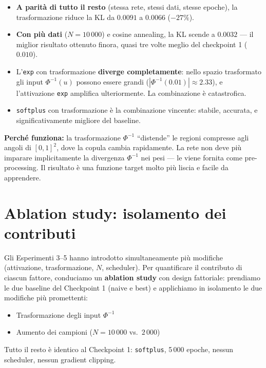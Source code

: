 \documentclass[11pt, a4paper]{article}
\begin{document}
\begin{itemize}
    \item \textbf{A parità di tutto il resto} (stessa rete, stessi dati, stesse epoche), la trasformazione riduce la KL da $0.0091$ a $0.0066$ ($-27\%$).
    \item \textbf{Con più dati} ($N = 10\,000$) e cosine annealing, la KL scende a $\mathbf{0.0032}$ --- il miglior risultato ottenuto finora, quasi tre volte meglio del checkpoint 1 ($0.010$).
    \item L'\texttt{exp} con trasformazione \textbf{diverge completamente}: nello spazio trasformato gli input $\Phi^{-1}(u)$ possono essere grandi ($|\Phi^{-1}(0.01)| \approx 2.33$), e l'attivazione \texttt{exp} amplifica ulteriormente. La combinazione è catastrofica.
    \item \texttt{softplus} con trasformazione è la combinazione vincente: stabile, accurata, e significativamente migliore del baseline.
\end{itemize}

\textbf{Perché funziona:} la trasformazione $\Phi^{-1}$ ``distende'' le regioni compresse agli angoli di $[0,1]^2$, dove la copula cambia rapidamente. La rete non deve più imparare implicitamente la divergenza $\Phi^{-1}$ nei pesi --- le viene fornita come pre-processing. Il risultato è una funzione target molto più liscia e facile da apprendere.

\section{Ablation study: isolamento dei contributi}

Gli Esperimenti 3--5 hanno introdotto simultaneamente più modifiche (attivazione, trasformazione, $N$, scheduler). Per quantificare il contributo di ciascun fattore, conduciamo un \textbf{ablation study} con design fattoriale: prendiamo le due baseline del Checkpoint 1 (naive e best) e applichiamo in isolamento le due modifiche più promettenti:
\begin{itemize}
    \item Trasformazione degli input $\Phi^{-1}$
    \item Aumento dei campioni ($N = 10\,000$ vs.\ $2\,000$)
\end{itemize}
Tutto il resto è identico al Checkpoint 1: \texttt{softplus}, 5\,000 epoche, nessun scheduler, nessun gradient clipping.
\end{document}
